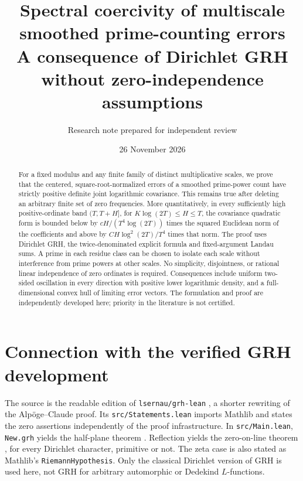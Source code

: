 \documentclass[11pt]{article}
\title{\textbf{Spectral coercivity of multiscale\\smoothed prime-counting errors}\\[5pt]\large A consequence of Dirichlet GRH without zero-independence assumptions}
\author{Research note prepared for independent review}
\date{26 November 2026}
\theoremstyle{remark}\newtheorem{remark}[theorem]{Remark}
\begin{document}
\maketitle
\begin{abstract}
For a fixed modulus and any finite family of distinct multiplicative scales, we prove that the centered, square-root-normalized errors of a smoothed prime-power count have strictly positive definite joint logarithmic covariance. This remains true after deleting an arbitrary finite set of zero frequencies. More quantitatively, in every sufficiently high positive-ordinate band $(T,T+H]$, for $K\log(2T)\le H\le T$, the covariance quadratic form is bounded below by $cH/(T^4\log(2T))$ times the squared Euclidean norm of the coefficients and above by $CH\log^2(2T)/T^4$ times that norm. The proof uses Dirichlet GRH, the twice-denominated explicit formula and fixed-argument Landau sums. A prime in each residue class can be chosen to isolate each scale without interference from prime powers at other scales. No simplicity, disjointness, or rational linear independence of zero ordinates is required. Consequences include uniform two-sided oscillation in every direction with positive lower logarithmic density, and a full-dimensional convex hull of limiting error vectors. The formulation and proof are independently developed here; priority in the literature is not certified.
\end{abstract}

\section{Connection with the verified GRH development}
The source is the readable edition of \texttt{lsernau/grh-lean} \cite{repo}, a shorter rewriting of the Alp\"oge--Claude proof. Its \texttt{src/Statements.lean} imports Mathlib and states the zero assertions independently of the proof infrastructure. In \texttt{src/Main.lean}, \texttt{New.grh} yields the half-plane theorem . Reflection yields the zero-on-line theorem , for every Dirichlet character, primitive or not. The zeta case is also stated as Mathlib's \texttt{RiemannHypothesis}. Only the classical Dirichlet version of GRH is used here, not GRH for arbitrary automorphic or Dedekind $L$-functions.
\end{document}
